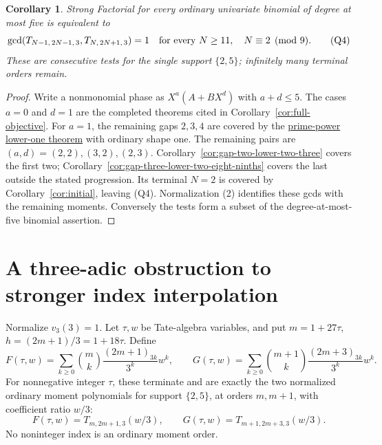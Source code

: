 \documentclass[11pt]{article}
\newtheorem{corollary}[theorem]{Corollary}
\begin{document}
\begin{corollary}\label{cor:ordinary-quintic-ray-reduction}
Strong Factorial for every ordinary univariate binomial of degree
at most five is equivalent to
\[
 \gcd(T_{N-1,\,2N-1,\,3},T_{N,\,2N+1,\,3})=1
 \quad\hbox{for every }N\ge11,\quad N\equiv2\pmod9.        \tag{Q4}\label{eq:quintic-ray-target}
\]
These are consecutive tests for the single support $\{2,5\}$;
infinitely many terminal orders remain.
\end{corollary}
\begin{proof}
Write a nonmonomial phase as $X^a(A+BX^d)$ with $a+d\le5$.
The cases $a=0$ and $d=1$ are the completed theorems cited in
Corollary~\ref{cor:full-objective}. For $a=1$, the remaining gaps
$2,3,4$ are covered by the
\href{ARITHMETIC_FRONTIER_TERMINAL_ORDERS.tex}{prime-power lower-one theorem}
with ordinary shape one.
The remaining pairs are $(a,d)=(2,2),(3,2),(2,3)$.
Corollary~\ref{cor:gap-two-lower-two-three} covers the first two;
Corollary~\ref{cor:gap-three-lower-two-eight-ninths} covers the last
outside the stated progression. Its terminal $N=2$ is covered
by Corollary~\ref{cor:initial}, leaving (Q4).
Normalization (2) identifies these gcds with the remaining moments.
Conversely the tests form a subset of the degree-at-most-five
binomial assertion.
\end{proof}

\section{A three-adic obstruction to stronger index interpolation}
Normalize $v_3(3)=1$. Let $\tau,w$ be Tate-algebra variables, and put
$m=1+27\tau$, $h=(2m+1)/3=1+18\tau$. Define
\[
 F(\tau,w)=\sum_{k\ge0}\binom mk\frac{(2m+1)_{3k}}{3^k}w^k,\qquad
 G(\tau,w)=\sum_{k\ge0}\binom{m+1}k\frac{(2m+3)_{3k}}{3^k}w^k.
\]
For nonnegative integer $\tau$, these terminate and are exactly the two
normalized ordinary moment polynomials for support $\{2,5\}$, at orders $m,m+1$,
with coefficient ratio $w/3$:
\[
 F(\tau,w)=T_{m,2m+1,3}(w/3),\qquad
 G(\tau,w)=T_{m+1,2m+3,3}(w/3).
\]
No noninteger index is an ordinary moment order.
\end{document}
